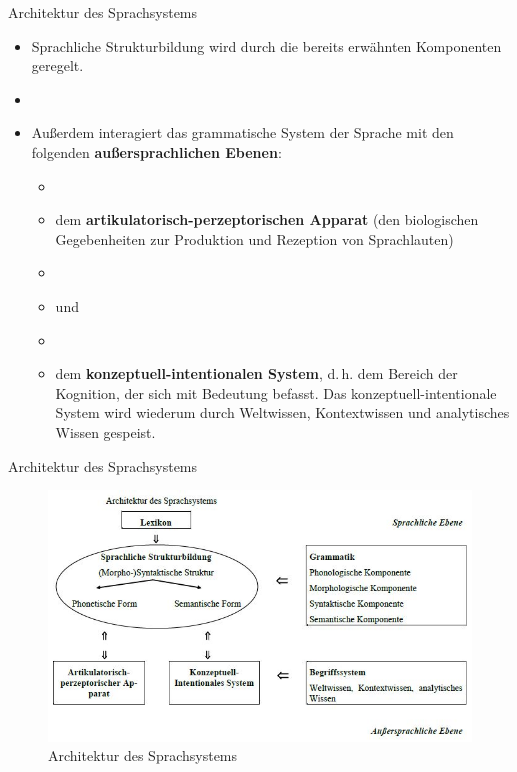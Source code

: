 \begin{frame}{Architektur des Sprachsystems}
	
	\begin{itemize}
		\item Sprachliche Strukturbildung wird durch die bereits erwähnten Komponenten geregelt.
		\item[]
		\item<2-> Außerdem interagiert das grammatische System der Sprache mit den folgenden \textbf{außersprachlichen Ebenen}:
				
		\begin{itemize}
			\item[]
			\item<3-> dem \textbf{artikulatorisch-perzeptorischen Apparat} (den biologischen Gegebenheiten zur Produktion und Rezeption von Sprachlauten)
			\item[]
			\item<3->[] und
			\item[]
			\item<4-> dem \textbf{konzeptuell-intentionalen System}, d.\,h. dem Bereich der Kognition, der sich mit Bedeutung befasst. Das konzeptuell-intentionale System wird wiederum durch Weltwissen, Kontextwissen und analytisches Wissen gespeist.
		\end{itemize}
			
	\end{itemize}
		
\end{frame}


\begin{frame}{Architektur des Sprachsystems}

\begin{figure}[H]
\centering
				
	\includegraphics[width=\textwidth]{material/03ArchitekturSprachsystem.jpg}
	\caption{Architektur des Sprachsystems \citep{Abramowski2016a}}
	\label{Zeichen3}

\end{figure}

\end{frame}			


